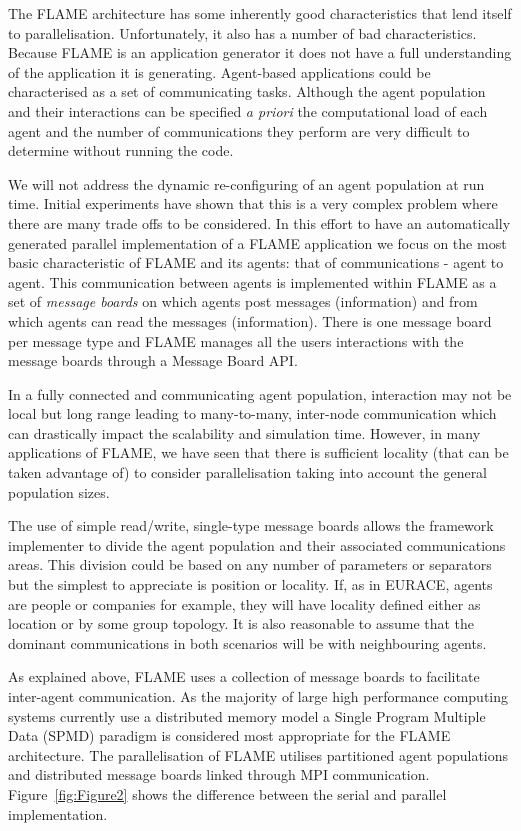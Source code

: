 The FLAME architecture has some inherently good characteristics that lend itself to parallelisation. Unfortunately, it also has a number of bad characteristics. Because FLAME is an application generator
it does not have a full understanding of the application it is generating. Agent-based applications could be characterised as a set of communicating tasks. Although the agent population and their interactions can be specified \textit{a priori} the computational load of each agent and the number of communications they perform are very difficult to determine without running the code. 

We will not address the dynamic re-configuring of an agent population at run time. Initial experiments have shown that this is a very complex problem where there are many trade offs to be considered. In this effort to have an automatically generated parallel implementation of a FLAME application we focus on the most basic characteristic of FLAME and its agents: that of communications - agent to agent. This communication between agents is implemented within FLAME as a set of \textit{message boards} on which agents post messages (information) and from which agents can read the messages (information). There is one message board per message type and FLAME manages all the users interactions with the message boards through a Message Board API.

In a fully connected and communicating agent population, interaction may not be local but long range leading to many-to-many, inter-node communication which can drastically impact the scalability and simulation time. However, in many applications of FLAME, we have seen that there is sufficient locality (that can be taken advantage of) to consider parallelisation taking into account the general population sizes. 

The use of simple read/write, single-type message boards allows the framework implementer to divide the agent population and their associated communications areas. This division could be based on any number of parameters or separators but the simplest to appreciate is position or locality. If, as in EURACE, agents are people or companies for example, they will have locality defined either as location or by some group topology. It is also reasonable to assume that the dominant communications in both scenarios will be with neighbouring agents.

As explained above, FLAME uses a collection of message boards to facilitate inter-agent communication. As the majority of large high performance computing systems currently use a distributed memory model a Single Program Multiple Data (SPMD) paradigm is considered most appropriate for the FLAME architecture. The parallelisation of FLAME utilises partitioned agent populations and distributed message boards linked through MPI communication. Figure~\ref{fig:Figure2} shows the difference between the serial and parallel implementation.


